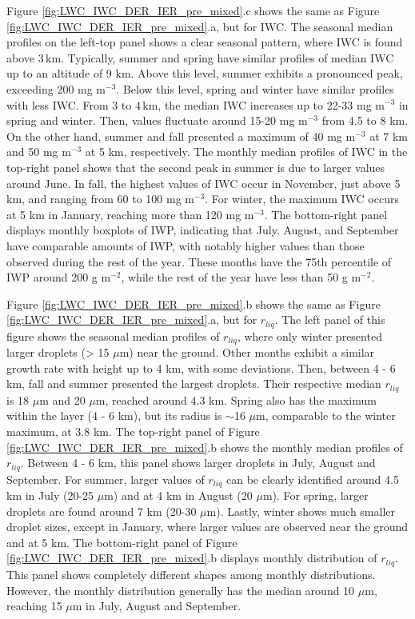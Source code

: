Figure \ref{fig:LWC_IWC_DER_IER_pre_mixed}.c shows the same as Figure \ref{fig:LWC_IWC_DER_IER_pre_mixed}.a, but for IWC. The seasonal median profiles on the left-top panel shows a clear seasonal pattern, where IWC is found above 3\,km. Typically, summer and spring have similar profiles of median IWC up to an altitude of 9 km. Above this level, summer exhibits a pronounced peak, exceeding 200 mg m$^{-3}$. Below this level, spring and winter have similar profiles with less IWC. From 3 to 4\,km, the median IWC increases up to 22-33 mg m$^{-3}$ in spring and winter. Then, values fluctuate around 15-20 mg m$^{-3}$ from 4.5 to 8 km. On the other hand, summer and fall presented a maximum of 40 mg m$^{-3}$ at 7 km and 50 mg m$^{-3}$ at 5 km, respectively. The monthly median profiles of IWC in the top-right panel shows that the second peak in summer is due to larger values around June. In fall, the highest values of IWC occur in November, just above 5 km, and ranging from 60 to 100 mg m$^{-3}$. For winter, the maximum IWC occurs at 5 km in January, reaching more than 120 mg m$^{-3}$. The bottom-right panel displays monthly boxplots of IWP, indicating that July, August, and September have comparable amounts of IWP, with notably higher values than those observed during the rest of the year. These months have the 75th percentile of IWP around 200 g m$^{-2}$, while the rest of the year have less than 50 g m$^{-2}$.


Figure \ref{fig:LWC_IWC_DER_IER_pre_mixed}.b shows the same as Figure \ref{fig:LWC_IWC_DER_IER_pre_mixed}.a, but for $r_{liq}$. The left panel of this figure shows the seasonal median profiles of $r_{liq}$, where only winter presented larger droplets (> 15 $\mu$m) near the ground. Other months exhibit a similar growth rate with height up to 4 km, with some deviations. Then, between 4 - 6 km, fall and summer presented the largest droplets. Their respective median $r_{liq}$ is 18 $\mu$m and 20 $\mu$m, reached around 4.3 km. Spring also has the maximum within the layer (4 - 6 km), but its radius is $\sim$16 $\mu$m, comparable to the winter maximum, at 3.8 km. The top-right panel of Figure \ref{fig:LWC_IWC_DER_IER_pre_mixed}.b shows the monthly median profiles of $r_{liq}$. Between 4 - 6 km, this panel shows larger droplets in July, August and September. For summer, larger values of $r_{liq}$ can be clearly identified around 4.5 km in July (20-25 $\mu$m) and at 4 km in August (20 $\mu$m). For spring, larger droplets are found around 7 km (20-30 $\mu$m). Lastly, winter shows much smaller droplet sizes, except in January, where larger values are observed near the ground and at 5 km. The bottom-right panel of Figure \ref{fig:LWC_IWC_DER_IER_pre_mixed}.b displays monthly distribution of $r_{liq}$. This panel shows completely different shapes among monthly distributions. However, the monthly distribution generally has the median around 10 $\mu$m, reaching 15 $\mu$m in July, August and September.


